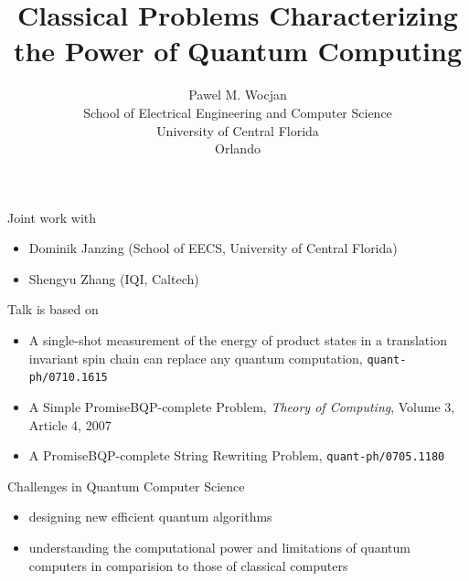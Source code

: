 \documentclass[slideColor]{prosper}
\title{Classical Problems Characterizing\\ the Power of Quantum Computing}
\author{Pawel M. Wocjan\\[1ex]School of Electrical Engineering and Computer Science\\ University of Central Florida\\Orlando}
\renewcommand{\>}{\rangle}
\newcommand{\<}{\langle}
\begin{document}
\maketitle


\begin{slide}{Joint work with}
\begin{itemize}
\item Dominik Janzing (School of EECS, University of Central Florida) 
\item Shengyu Zhang (IQI, Caltech)
\end{itemize}

Talk is based on
\begin{itemize}
\item A single-shot measurement of the energy of product states in a translation invariant spin chain can replace any quantum computation, \texttt{quant-ph/0710.1615}

\medskip
\item A Simple PromiseBQP-complete Problem, {\em Theory of Computing}, Volume 3, Article 4, 2007

\medskip
\item A PromiseBQP-complete String Rewriting Problem, \texttt{quant-ph/0705.1180}
\end{itemize}
\end{slide}


\begin{slide}{Challenges in Quantum Computer Science}

\begin{itemize}
\item designing new efficient quantum algorithms
\item	understanding the computational power and limitations of quantum computers in comparision to those of classical computers 
\end{itemize}

\end{slide}

\end{document}

